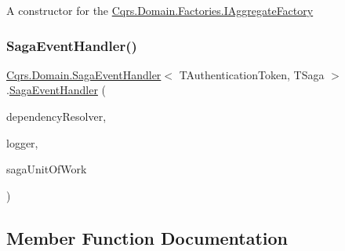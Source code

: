 A constructor for the \hyperlink{interfaceCqrs_1_1Domain_1_1Factories_1_1IAggregateFactory}{Cqrs.\+Domain.\+Factories.\+I\+Aggregate\+Factory} 

\mbox{\label{classCqrs_1_1Domain_1_1SagaEventHandler_a061ebe3676b158d952b26629195df627_a061ebe3676b158d952b26629195df627}} 
\subsubsection{\texorpdfstring{Saga\+Event\+Handler()}{SagaEventHandler()}\hspace{0.1cm}{\footnotesize\ttfamily [2/2]}}
{\footnotesize\ttfamily \hyperlink{classCqrs_1_1Domain_1_1SagaEventHandler}{Cqrs.\+Domain.\+Saga\+Event\+Handler}$<$ T\+Authentication\+Token, T\+Saga $>$.\hyperlink{classCqrs_1_1Domain_1_1SagaEventHandler}{Saga\+Event\+Handler} (\begin{DoxyParamCaption}\item[{\hyperlink{interfaceCqrs_1_1Configuration_1_1IDependencyResolver}{I\+Dependency\+Resolver}}]{dependency\+Resolver,  }\item[{I\+Logger}]{logger,  }\item[{\hyperlink{interfaceCqrs_1_1Domain_1_1ISagaUnitOfWork}{I\+Saga\+Unit\+Of\+Work}$<$ T\+Authentication\+Token $>$}]{saga\+Unit\+Of\+Work }\end{DoxyParamCaption})\hspace{0.3cm}{\ttfamily [protected]}}



\subsection{Member Function Documentation}
\mbox{\label{classCqrs_1_1Domain_1_1SagaEventHandler_ad3ef0b5067004d4930c45a6585f54764_ad3ef0b5067004d4930c45a6585f54764}} 
